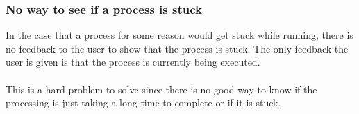\subsubsection{No way to see if a process is stuck}
In the case that a process for some reason would get stuck while running, there is no feedback to the user to show that the process is stuck. The only feedback the user is given is that the process is currently being executed.\\
\\
This is a hard problem to solve since there is no good way to know if the processing is just taking a long time to complete or if it is stuck. 
